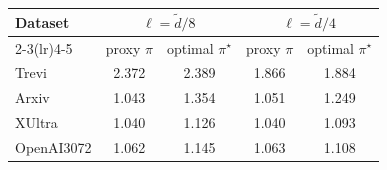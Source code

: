 \begin{tabular}{@{}lcccc@{}}
\toprule
Dataset & \multicolumn{2}{c}{$\ell=\tilde{d}/8$} & \multicolumn{2}{c}{$\ell=\tilde{d}/4$} \\
\cmidrule(lr){2-3}\cmidrule(lr){4-5} & proxy $\pi$ & optimal $\pi^\star$ & proxy $\pi$ & optimal $\pi^\star$ \\
\midrule
Trevi & 2.372 & 2.389 & 1.866 & 1.884 \\
Arxiv & 1.043 & 1.354 & 1.051 & 1.249 \\
XUltra & 1.040 & 1.126 & 1.040 & 1.093 \\
OpenAI3072 & 1.062 & 1.145 & 1.063 & 1.108 \\
\bottomrule
\end{tabular}
